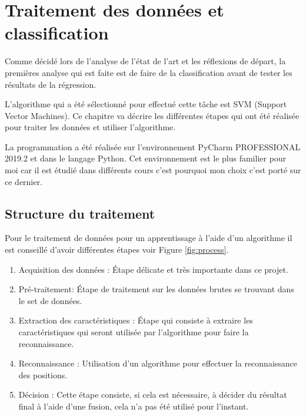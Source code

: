 \chapter{Traitement des données et classification}
Comme décidé lors de l'analyse de l'état de l'art et les réflexions de départ, la premières analyse qui est faite est de faire de la classification avant de tester les résultats de la régression. 

L'algorithme qui a été sélectionné pour effectué cette tâche est SVM (Support Vector Machines). Ce chapitre va décrire les différentes étapes qui ont été réalisée pour traiter les données et utiliser l'algorithme.

La programmation a été réalisée sur l'environnement PyCharm PROFESSIONAL 2019.2 et dans le langage Python. Cet environnement est le plus familier pour moi car il est étudié dans différents cours c'est pourquoi mon choix c'est porté sur ce dernier. 



\section{Structure du traitement}
Pour le traitement de données pour un apprentissage à l'aide d'un algorithme il est conseillé d'avoir différentes étapes voir Figure \ref{fig:process}. 

\begin{enumerate} 
	\item Acquisition des données : Étape délicate et très importante dans ce projet.
	\item Pré-traitement: Étape de traitement sur les données brutes se trouvant dans le set de données.
	\item Extraction des caractéristiques : Étape qui consiste à extraire les caractéristiques qui seront utilisée par l’algorithme pour faire la reconnaissance. 
	\item Reconnaissance : Utilisation d’un algorithme pour effectuer la reconnaissance des positions. 
	\item Décision :  Cette étape consiste, si cela est nécessaire, à décider du résultat final à l’aide d’une fusion, cela n'a pas été utilisé pour l'instant.
\end{enumerate}

